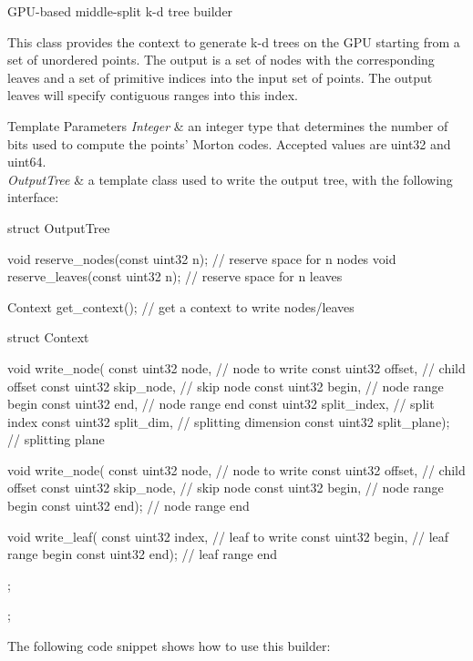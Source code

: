 \-G\-P\-U-\/based middle-\/split k-\/d tree builder

\-This class provides the context to generate k-\/d trees on the \-G\-P\-U starting from a set of unordered points. \-The output is a set of nodes with the corresponding leaves and a set of primitive indices into the input set of points. \-The output leaves will specify contiguous ranges into this index.


\begin{DoxyTemplParams}{\-Template Parameters}
{\em \-Integer} & an integer type that determines the number of bits used to compute the points' \-Morton codes. \-Accepted values are uint32 and uint64.\\
\hline
{\em \-Output\-Tree} & a template class used to write the output tree, with the following interface\-:\\
\hline
\end{DoxyTemplParams}

\begin{DoxyCode}
 struct OutputTree
 {
    void reserve_nodes(const uint32 n);  // reserve space for n nodes
    void reserve_leaves(const uint32 n); // reserve space for n leaves

    Context get_context();             // get a context to write nodes/leaves

    struct Context
    {
        void write_node(
           const uint32 node,          // node to write
           const uint32 offset,        // child offset
           const uint32 skip_node,     // skip node
           const uint32 begin,         // node range begin
           const uint32 end,           // node range end
           const uint32 split_index,   // split index
           const uint32 split_dim,     // splitting dimension
           const uint32 split_plane);  // splitting plane

        void write_node(
           const uint32 node,          // node to write
           const uint32 offset,        // child offset
           const uint32 skip_node,     // skip node
           const uint32 begin,         // node range begin
           const uint32 end);          // node range end

        void write_leaf(
           const uint32 index,         // leaf to write
           const uint32 begin,         // leaf range begin
           const uint32 end);          // leaf range end
    };
 };
\end{DoxyCode}


\-The following code snippet shows how to use this builder\-:


